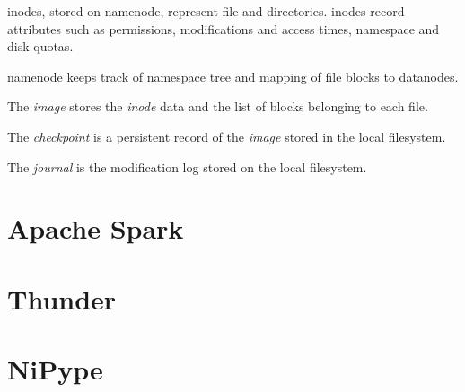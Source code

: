 \documentclass{report}
\begin{document}
 




inodes, stored on namenode, represent file and directories. inodes record attributes such as permissions, modifications and access times, namespace and disk quotas.

namenode keeps track of namespace tree and mapping of file blocks to datanodes.

The \textit{image} stores the \textit{inode} data and the list of blocks belonging to each file.

The \textit{checkpoint} is a persistent record of the \textit{image} stored in the local filesystem.

The \textit{journal} is the modification log stored on the local filesystem.

\section{Apache Spark}
\cite{spark}
\section{Thunder}
\cite{thunder}
\section{NiPype}
\cite{nipype}



\end{document}
